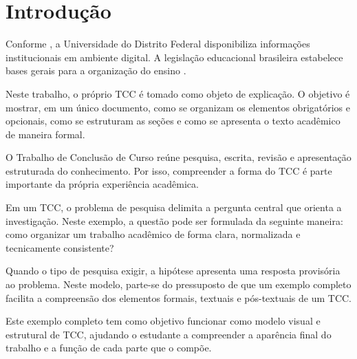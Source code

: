 %
%
%
%
%

\chapter{Introdução}

Conforme \textcite{undfsite2026}, a Universidade do Distrito Federal disponibiliza informações institucionais em ambiente digital. A legislação educacional brasileira estabelece bases gerais para a organização do ensino \parencite{brasil1996ldb}.

Neste trabalho, o próprio TCC é tomado como objeto de explicação. O objetivo é mostrar, em um único documento, como se organizam os elementos obrigatórios e opcionais, como se estruturam as seções e como se apresenta o texto acadêmico de maneira formal.


O Trabalho de Conclusão de Curso reúne pesquisa, escrita, revisão e apresentação estruturada do conhecimento. Por isso, compreender a forma do TCC é parte importante da própria experiência acadêmica.


Em um TCC, o problema de pesquisa delimita a pergunta central que orienta a investigação. Neste exemplo, a questão pode ser formulada da seguinte maneira: como organizar um trabalho acadêmico de forma clara, normalizada e tecnicamente consistente?


Quando o tipo de pesquisa exigir, a hipótese apresenta uma resposta provisória ao problema. Neste modelo, parte-se do pressuposto de que um exemplo completo facilita a compreensão dos elementos formais, textuais e pós-textuais de um TCC.


Este exemplo completo tem como objetivo funcionar como modelo visual e estrutural de TCC, ajudando o estudante a compreender a aparência final do trabalho e a função de cada parte que o compõe.

